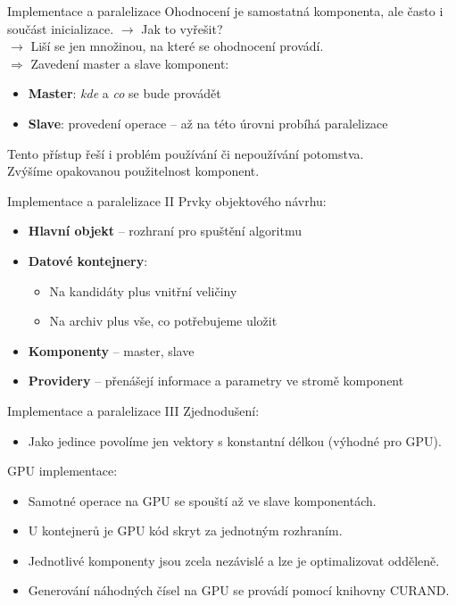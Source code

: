 \documentclass[compress,mathserif]{beamer}
\theoremstyle{definition}
\theoremstyle{plain}
\newcommand{\beI}{\begin{itemize}}
\newcommand{\enI}{\end{itemize}}
\begin{document}
     \begin{frame}{Implementace a paralelizace}
        Ohodnocení je samostatná komponenta, ale často i součást inicializace. $\rightarrow$ Jak to vyřešit? \\ $\rightarrow$ Liší se jen množinou, na které se ohodnocení provádí. \\
        $\Rightarrow$ Zavedení master a slave komponent:
        \beI
            \item \textbf{Master}: \emph{kde} a \emph{co} se bude provádět
            \item \textbf{Slave}: provedení operace -- až na této úrovni probíhá paralelizace
        \enI
        Tento přístup řeší i problém používání či nepoužívání potomstva. \\
        Zvýšíme opakovanou použitelnost komponent.
     \end{frame}

     \begin{frame}{Implementace a paralelizace II}
       Prvky objektového návrhu:
        \beI
            \item \textbf{Hlavní objekt} -- rozhraní pro spuštění algoritmu
            \item \textbf{Datové kontejnery}:
            \beI
                \item Na kandidáty plus vnitřní veličiny
                \item Na archiv plus vše, co potřebujeme uložit
            \enI
            \item \textbf{Komponenty} -- master, slave
            \item \textbf{Providery} -- přenášejí informace a parametry ve stromě komponent
        \enI
     \end{frame}

     \begin{frame}{Implementace a paralelizace III}
        Zjednodušení:
        \beI
            \item Jako jedince povolíme jen vektory s konstantní délkou (výhodné pro GPU).
        \enI
        \vspace{5mm}
        GPU implementace:
        \beI
            \item Samotné operace na GPU se spouští až ve slave komponentách.
            \item U kontejnerů je GPU kód skryt za jednotným rozhraním.
            \item Jednotlivé komponenty jsou zcela nezávislé a lze je optimalizovat odděleně.
            \item Generování náhodných čísel na GPU se provádí pomocí knihovny CURAND.
        \enI
     \end{frame}
\end{document}
